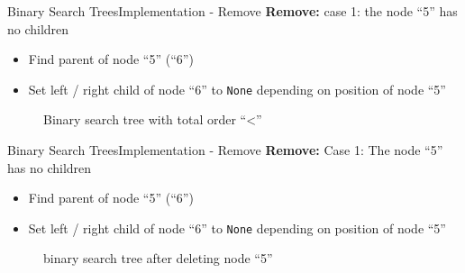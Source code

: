
\begin{frame}{Binary Search Trees}{Implementation - Remove}
  \textbf{Remove:} case 1: the node \enquote{5} has no children\\
  \begin{itemize}
    \item<2->
      Find {\color{Mittel-Blau}parent} of node \enquote{5} (\enquote{6})
    \item<3->
      Set left / right child of node \enquote{6} to
      \texttt{\color{Mittel-Blau}None} depending on position of node \enquote{5}
  \end{itemize}
  \begin{figure}
    
    \caption{Binary search tree with total order
      \enquote{\color{Mittel-Blau}<}}
    \label{fig:binary_search_trees:binary_tree_remove_no_child}
  \end{figure}
\end{frame}


\begin{frame}{Binary Search Trees}{Implementation - Remove}
  \textbf{Remove:} Case 1: The node \enquote{5} has no children\\
  \begin{itemize}
    \item
      Find {\color{Mittel-Blau}parent} of node \enquote{5} (\enquote{6})
    \item
      Set left / right child of node \enquote{6} to
      \texttt{\color{Mittel-Blau}None} depending on position of node \enquote{5}
  \end{itemize}
  \begin{figure}
    
    \caption{binary search tree after deleting node \enquote{5}}
    \label{fig:binary_search_trees:binary_tree_remove_no_child_result}
  \end{figure}
\end{frame}


